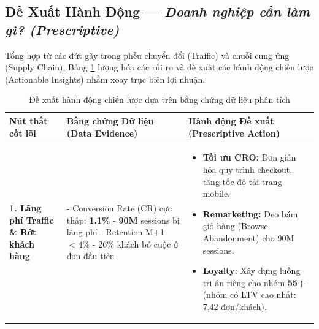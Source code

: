 \documentclass{article}
\begin{document}
\vspace{-6pt} %
\subsection{Đề Xuất Hành Động — \textit{Doanh nghiệp cần làm gì? (Prescriptive)}}
\vspace{-2pt}

Tổng hợp từ các đứt gãy trong phễu chuyển đổi (Traffic) và chuỗi cung ứng (Supply Chain), Bảng \ref{tab:prescriptive} lượng hóa các rủi ro và đề xuất các hành động chiến lược (Actionable Insights) nhằm xoay trục biên lợi nhuận.

\begin{table}[H] %
\centering
\caption{Đề xuất hành động chiến lược dựa trên bằng chứng dữ liệu phân tích}
\label{tab:prescriptive}
\scriptsize
\setlength{\tabcolsep}{3pt}
\renewcommand{\arraystretch}{1.1}
\begin{tabular}{p{2.5cm} p{4.6cm} p{5.8cm}}
\toprule
\textbf{Nút thắt cốt lõi} & \textbf{Bằng chứng Dữ liệu (Data Evidence)} & \textbf{Hành động Đề xuất (Prescriptive Action)} \\
\midrule

\textbf{1. Lãng phí Traffic \& \newline Rớt khách hàng} & 
- Conversion Rate (CR) cực thấp: \textbf{1,1\%} \newline
- \textbf{90M} sessions bị lãng phí \newline
- Retention M+1 $< 4\%$ \newline
- 26\% khách bỏ cuộc ở đơn đầu tiên & 
\vspace{-8pt}\begin{itemize}
    \item \textbf{Tối ưu CRO:} Đơn giản hóa quy trình checkout, tăng tốc độ tải trang mobile.
    \item \textbf{Remarketing:} Đeo bám giỏ hàng (Browse Abandonment) cho 90M sessions.
    \item \textbf{Loyalty:} Xây dựng luồng tri ân riêng cho nhóm \textbf{55+} (nhóm có LTV cao nhất: 7,42 đơn/khách).
\end{itemize}\vspace{-8pt} \\

\midrule


\end{tabular}
\end{table}
\end{document}
